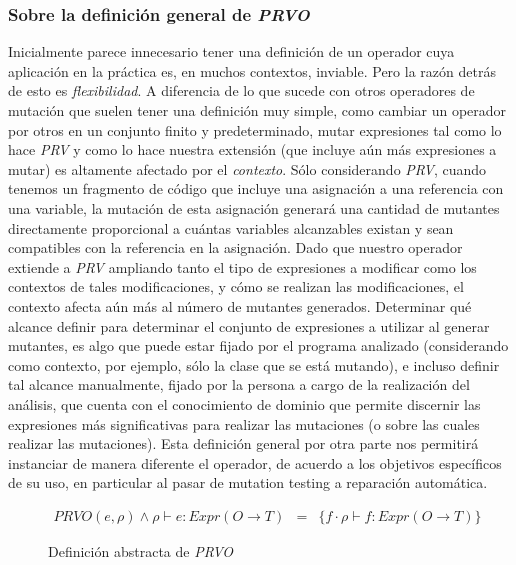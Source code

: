 \subsubsection{Sobre la definici\'on general de \emph{PRVO}}
Inicialmente parece innecesario tener una definici\'on de un operador cuya aplicaci\'on en la pr\'actica es, en muchos contextos, inviable. Pero la raz\'on detr\'as de esto es \emph{flexibilidad}. A diferencia de lo que sucede con otros operadores de mutaci\'on que suelen tener una definici\'on muy simple, como cambiar un operador por otros en un conjunto finito y predeterminado, mutar expresiones tal como lo hace \emph{PRV} y como lo hace nuestra extensi\'on (que incluye a\'un m\'as expresiones a mutar) es altamente afectado por el \emph{contexto}. S\'olo considerando \emph{PRV}, cuando tenemos un fragmento de c\'odigo que incluye una asignaci\'on a una referencia con una variable, la mutaci\'on de esta asignaci\'on generar\'a una cantidad de mutantes directamente proporcional a cu\'antas variables alcanzables existan y sean compatibles con la referencia en la asignaci\'on. Dado que nuestro operador extiende a \emph{PRV} ampliando tanto el tipo de expresiones a modificar como los contextos de tales modificaciones, y c\'omo se realizan las modificaciones, el contexto afecta a\'un m\'as al n\'umero de mutantes generados. Determinar qu\'e alcance definir para determinar el conjunto de expresiones a utilizar al generar mutantes, es algo que puede estar fijado por el programa analizado (considerando como contexto, por ejemplo, s\'olo la clase que se est\'a mutando), e incluso definir tal alcance manualmente, fijado por la persona a cargo de la realizaci\'on del an\'alisis, que cuenta con el conocimiento de dominio que permite discernir las expresiones m\'as significativas para realizar las mutaciones (o sobre las cuales realizar las mutaciones). Esta definici\'on general por otra parte nos permitir\'a instanciar de manera diferente el operador, de acuerdo a los objetivos espec\'ificos de su uso, en particular al pasar de mutation testing a reparaci\'on autom\'atica. 

\begin{figure}
	\begin{displaymath}
	\begin{array}{lll}
	PRVO(e, \rho) \wedge \rho \vdash e : Expr(O \rightarrow T) & = & \{f \cdot \rho \vdash f : Expr(O \rightarrow T)\} 
	\end{array}
	\end{displaymath}
	\caption{Definici\'on abstracta de \emph{PRVO}}
	\label{figures.definitions.prvo.simple_def}
\end{figure}

